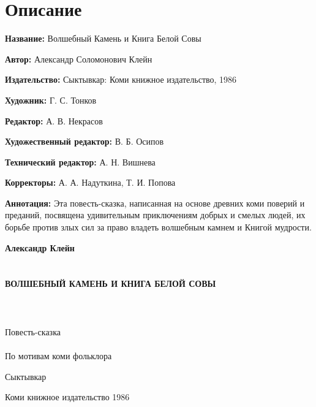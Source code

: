 \documentclass[oneside,final,14pt]{extreport}
\begin{document}
	
	\section*{Описание}
	
	{\bf Название:} Волшебный Камень и Книга Белой Совы
	
	{\bf Автор:} Александр Соломонович Клейн
	
	{\bf Издательство:} Сыктывкар: Коми книжное издательство, 1986
	
	{\bf Художник:} Г. С. Тонков
	
	{\bf Редактор:} А. В. Некрасов
	
	{\bf Художественный редактор:} В. Б. Осипов
	
	{\bf Технический редактор:} А. Н. Вишнева
	
	{\bf Корректоры:} А. А. Надуткина, Т. И. Попова
	
	{\bf Аннотация:} Эта повесть-сказка, написанная на основе древних коми поверий и преданий, посвящена удивительным приключениям добрых и смелых людей, их борьбе против злых сил за право владеть волшебным камнем и Книгой мудрости.
	\thispagestyle{empty} %
	\newpage
	
	\begin{titlepage}
		
		\begin{center}
			
			\vspace*{\fill}
			
			
			{\large\bf Александр Клейн\\}
			\ \\
			\ \\
			{\Huge\bf ВОЛШЕБНЫЙ КАМЕНЬ И КНИГА БЕЛОЙ СОВЫ\\}
			\ \\
			\ \\
			\ \\
			Повесть-сказка
			\ \\
			\ \\
			По мотивам коми фольклора
			\vspace*{\fill}    
			
			\vfill
			
			Сыктывкар
			
			Коми книжное издательство 1986
		\end{center}
		
	\end{titlepage}
	
\end{document}
